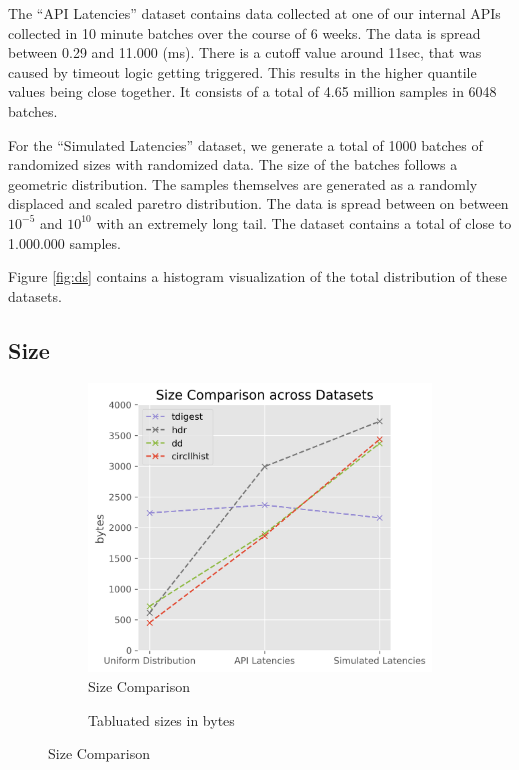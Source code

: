 \documentclass{article}
\theoremstyle{plain}
\theoremstyle{remark}
\begin{document}
The ``API Latencies'' dataset contains data collected at one of our internal APIs collected in 10
minute batches over the course of 6 weeks.  The data is spread between 0.29 and 11.000 (ms).  There
is a cutoff value around 11sec, that was caused by timeout logic getting triggered.  This results in
the higher quantile values being close together.  It consists of a total of 4.65 million samples in
6048 batches.

For the ``Simulated Latencies'' dataset, we generate a total of 1000 batches of randomized sizes
with randomized data.  The size of the batches follows a geometric distribution.  The samples
themselves are generated as a randomly displaced and scaled paretro distribution.  The data is
spread between on between $10^{-5}$ and $10^{10}$ with an extremely long tail.  The dataset contains
a total of close to 1.000.000 samples.

Figure \ref{fig:ds} contains a histogram visualization of the total distribution of these datasets.

\subsection{Size}

\begin{figure}
    \begin{subfigure}{0.33\textwidth}
      \includegraphics[width=\textwidth]{evaluation/images/all_size_line.png}
      \caption{Size Comparison}
      \label{fig:size}
    \end{subfigure}
    \begin{subfigure}{0.66\textwidth}
      
      \caption{Tabluated sizes in bytes}
      \label{fig:tsize}
    \end{subfigure}
    \caption{Size Comparison}
\end{figure}
\end{document}
